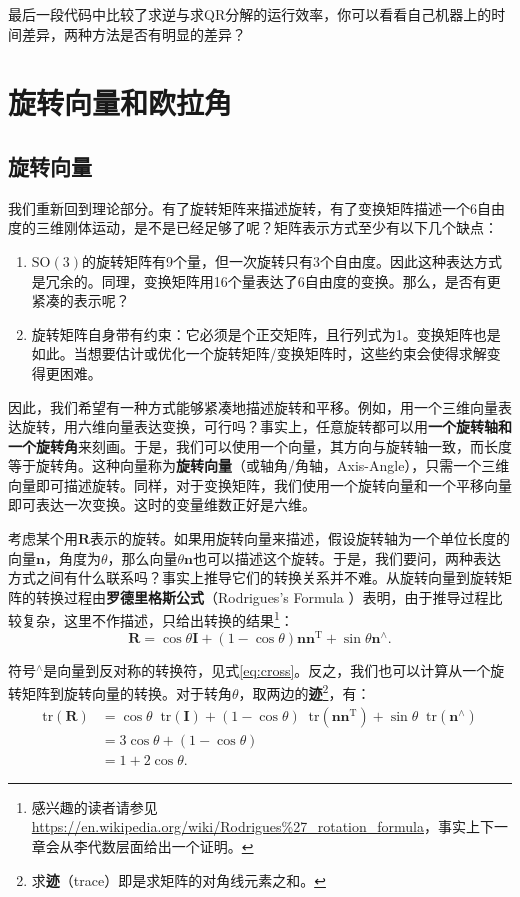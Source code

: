 最后一段代码中比较了求逆与求QR分解的运行效率，你可以看看自己机器上的时间差异，两种方法是否有明显的差异？

\section{旋转向量和欧拉角}
\subsection{旋转向量}
我们重新回到理论部分。有了旋转矩阵来描述旋转，有了变换矩阵描述一个6自由度的三维刚体运动，是不是已经足够了呢？矩阵表示方式至少有以下几个缺点：

\begin{enumerate}
	\item $\mathrm{SO}(3)$的旋转矩阵有9个量，但一次旋转只有3个自由度。因此这种表达方式是冗余的。同理，变换矩阵用16个量表达了6自由度的变换。那么，是否有更紧凑的表示呢？
	\item 旋转矩阵自身带有约束：它必须是个正交矩阵，且行列式为1。变换矩阵也是如此。当想要估计或优化一个旋转矩阵/变换矩阵时，这些约束会使得求解变得更困难。
\end{enumerate}

因此，我们希望有一种方式能够紧凑地描述旋转和平移。例如，用一个三维向量表达旋转，用六维向量表达变换，可行吗？事实上，任意旋转都可以用\textbf{一个旋转轴和一个旋转角}来刻画。于是，我们可以使用一个向量，其方向与旋转轴一致，而长度等于旋转角。这种向量称为\textbf{旋转向量}（或轴角/角轴，Axis-Angle），只需一个三维向量即可描述旋转。同样，对于变换矩阵，我们使用一个旋转向量和一个平移向量即可表达一次变换。这时的变量维数正好是六维。

考虑某个用$\bm{R}$表示的旋转。如果用旋转向量来描述，假设旋转轴为一个单位长度的向量$\bm{n}$，角度为$\theta$，那么向量$\theta \bm{n}$也可以描述这个旋转。于是，我们要问，两种表达方式之间有什么联系吗？事实上推导它们的转换关系并不难。从旋转向量到旋转矩阵的转换过程由\textbf{罗德里格斯公式}（Rodrigues's Formula ）表明，由于推导过程比较复杂，这里不作描述，只给出转换的结果\footnote{感兴趣的读者请参见\url{https://en.wikipedia.org/wiki/Rodrigues\%27_rotation_formula}，事实上下一章会从李代数层面给出一个证明。}：
\begin{equation}
\label{eq:rogridues}
\bm{R} = \cos \theta \bm{I} + \left( {1 - \cos \theta } \right) \bm{n}{\bm{n}^\mathrm{T}} + \sin \theta { \bm{n}^ \wedge }.
\end{equation}

符号$^\wedge$是向量到反对称的转换符，见式\eqref{eq:cross}。反之，我们也可以计算从一个旋转矩阵到旋转向量的转换。对于转角$\theta$，取两边的\textbf{迹}\footnote{求\textbf{迹}（trace）即是求矩阵的对角线元素之和。}，有：
\begin{equation}
\begin{aligned}
  \mathrm{tr} \left( \bm{R} \right) &= \cos \theta \mathop{}\!\mathrm{tr}\left( \bm{I} \right) + \left( {1 - \cos \theta } \right) \mathop{}\!\mathrm{tr} \left( { \bm{n} {\bm{n}^\mathrm{T}}} \right) + \sin \theta \mathop{}\!\mathrm{tr} ({\bm{n}^ \wedge })\\
&= 3\cos \theta  + (1 - \cos \theta )\\
&= 1 + 2\cos \theta .
\end{aligned} 
\end{equation}

